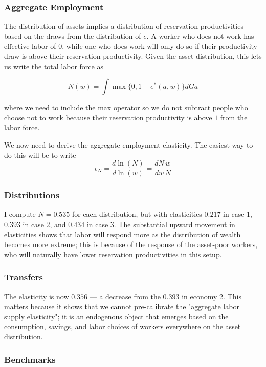 \documentclass[12pt, letterpaper, parskip = full]{article}
\begin{document}
    \subsubsection{Aggregate Employment}

    The distribution of assets implies a distribution of reservation productivities based on the draws from the distribution of \(e\). A worker who does not work has effective labor of \(0\), while one who does work will only do so if their productivity draw is above their reservation productivity. Given the asset distribution, this lets us write the total labor force as

    \[ N(w) = \int \max{\{0,1-e^*(a,w)\}} dGa    \]

    where we need to include the max operator so we do not subtract people who choose not to work because their reservation productivity is above \(1\) from the labor force.

    We now need to derive the aggregate employment elasticity. The easiest way to do this will be to write
    \[ \epsilon_N = \frac{d \ln(N)}{d \ln(w)} = \frac{dN}{dw} \frac{w}{N}  \]
    

    \subsubsection{Distributions}

    I compute \(N = 0.535\) for each distribution, but with elasticities \(0.217\) in case 1, \(0.393\) in case 2, and \(0.434\) in case 3. The substantial upward movement in elasticities shows that labor will respond more as the distribution of wealth becomes more extreme; this is because of the response of the asset-poor workers, who will naturally have lower reservation productivities in this setup.

    \subsubsection{Transfers}

    The elasticity is now \(0.356\) --- a decrease from the \(0.393\) in economy 2. This matters because it shows that we cannot pre-calibrate the "aggregate labor supply elasticity"; it is an endogenous object that emerges based on the consumption, savings, and labor choices of workers everywhere on the asset distribution.  

    \subsubsection{Benchmarks}
\end{document}
